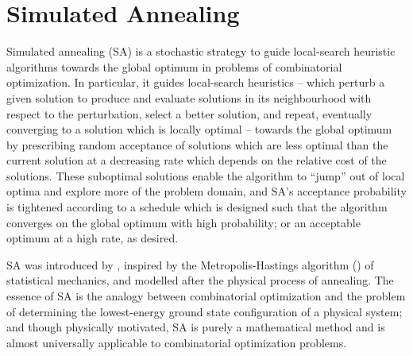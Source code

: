 \section{Simulated Annealing}
Simulated annealing (SA) is a stochastic strategy to guide local-search heuristic algorithms towards the global optimum in problems of combinatorial optimization. In particular, it guides local-search heuristics -- which perturb a given solution to produce and evaluate solutions in its neighbourhood with respect to the perturbation, select a better solution, and repeat, eventually converging to a solution which is locally optimal -- towards the global optimum by prescribing random acceptance of solutions which are less optimal than the current solution at a decreasing rate which depends on the relative cost of the solutions. These suboptimal solutions enable the algorithm to ``jump'' out of local optima and explore more of the problem domain, and SA's acceptance probability is tightened according to a schedule which is designed such that the algorithm converges on the global optimum with high probability; or an acceptable optimum at a high rate, as desired.

SA was introduced by \textcite{Kirkpatrick671}, inspired by the Metropolis-Hastings algorithm (\cite{metro53}) of statistical mechanics, and modelled after the physical process of annealing. The essence of SA is the analogy between combinatorial optimization and the problem of determining the lowest-energy ground state configuration of a physical system; and though physically motivated, SA is purely a mathematical method and is almost universally applicable to combinatorial optimization problems.


